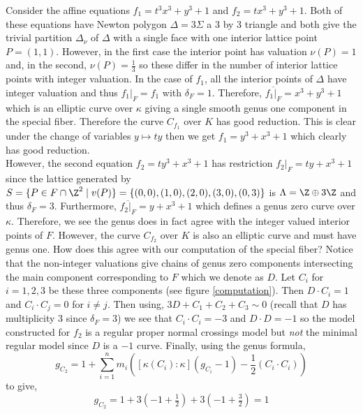 \begin{example}
Consider the affine equations $f_1 = t^3 x^3 + y^3 + 1$ and $f_2 = t x^3 + y^3 + 1$. Both of these equations have Newton polygon $\Delta = 3 \Sigma$ a 3 by 3 triangle and both give the trivial partition $\Delta_\nu$ of $\Delta$ with a single face with one interior lattice point $P = (1,1)$. However, in the first case the interior point has valuation $\nu(P) = 1$ and, in the second, $\nu(P) = \tfrac{1}{3}$ so these differ in the number of interior lattice points with integer valuation. In the case of $f_1$, all the interior points of $\Delta$ have integer valuation and thus $f_1 |_F = f_1$ with $\delta_F = 1$. Therefore, $\overline{f_1 |_F} = x^3 + y^3 + 1$ which is an elliptic curve over $\kappa$ giving a single smooth genus one component in the special fiber. Therefore the curve $C_{f_1}$ over $K$ has good reduction. This is clear under the change of variables $y \mapsto t y$ then we get $f_1 = y^3 + x^3 + 1$ which clearly has good reduction. 
\bigskip\\
However, the second equation $f_2  = t y^3 + x^3 + 1$ has restriction $f_2 |_F = t y + x^3 + 1$ since the lattice generated by $S = \{ P \in F \cap \Z^2 \mid v(P) \} = \{ (0,0), (1,0), (2,0), (3,0), (0,3) \}$ is $\Lambda = \Z \oplus 3 \Z$ and thus $\delta_F = 3$. Furthermore, $\overline{f_2 |_F} = y + x^3 + 1$ which defines a genus zero curve over $\kappa$. Therefore, we see the genus does in fact agree with the integer valued interior points of $F$. However, the curve $C_{f_2}$ over $K$ is also an elliptic curve and must have genus one. How does this agree with our computation of the special fiber? Notice that the non-integer valuations give chains of genus zero components intersecting the main component corresponding to $F$ which we denote as $D$. Let $C_i$ for $i = 1,2,3$ be these three components (see figure \ref{computation}). Then $D \cdot C_i = 1$ and $C_i \cdot C_j = 0$ for $i \neq j$. Then using, $3 D + C_1 + C_2 + C_3 \sim 0$ (recall that $D$ has multiplicity $3$ since $\delta_F = 3$) we see that $C_i \cdot C_i = -3$ and $D \cdot D = -1$ so the model constructed for $f_2$ is a regular proper normal crossings model but \textit{not} the minimal regular model since $D$ is a $-1$ curve. Finally, using the genus formula,
\[ g_{C_2} = 1 + \sum_{i = 1}^n m_i \left( [\kappa(C_i) : \kappa] (g_{C_i} - 1) - \frac{1}{2} (C_i \cdot C_i) \right) \]
to give,
\[ g_{C_2} = 1 + 3 (-1 + \tfrac{1}{2}) + 3 (-1 + \tfrac{3}{2}) = 1 \]


\end{example}
